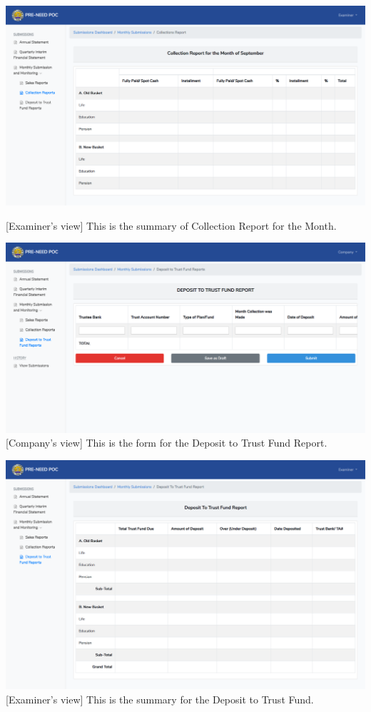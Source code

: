 \documentclass{article}
\begin{document}
\includegraphics[keepaspectratio=true]{up-ic-screens/image201}{}%

[Examiner’s view] This is the summary of Collection
Report for the Month.%

\includegraphics[keepaspectratio=true]{up-ic-screens/image219}{}[Company’s view] This is the form for the Deposit to Trust
Fund Report.%

\includegraphics[keepaspectratio=true]{up-ic-screens/image57}{}[Examiner’s view] This is the summary for the Deposit to
Trust Fund.%
\end{document}
